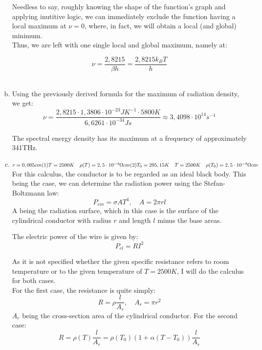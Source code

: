 \documentclass[a4paper,german,12pt]{scrartcl}
\begin{document}
\begin{enumerate}[(a)]
Needless to say, roughly knowing the shape of the function's graph and applying inutitive logic, we can immediately exclude the function having a local maximum at $\nu=0$, where, in fact, we will obtain a local (and global) minimum.\\
 Thus, we are left with one single local and global maximum, namely at:

\begin{equation*}
\nu=\frac{2,8215}{\beta h}=\frac{2,8215k_BT}{h}
\end{equation*}\\

\item Using the previously derived formula for the maximum of radiation density, we get:
\begin{equation*}
\nu=\frac{2,8215\cdot 1,3806 \cdot 10^{-23}JK^{-1}\cdot 5800K}{6,6261\cdot 10^{-34}Js}\approx 3,4098\cdot 10^{14}s^{-1}
\end{equation*}

The spectral energy density has its maximum at a frequency of approximately 341THz.

\item $r=0,005cm\\
 (1)T=2500K \quad \rho(T)=2,5\cdot 10^{-4}\Omega cm\\ (2)T_0=295,15K \quad T=2500K \quad \rho(T_0)=2,5\cdot 10^{-4}\Omega cm$\\

For this calculus, the conductor is to be regarded as an ideal black body. This being the case, we can determine the radiation power using the Stefan-Boltzmann law:
\begin{equation*}
P_{em}=\sigma A T^4, \quad A=2\pi r l
\end{equation*}
A being the radiation surface, which in this case is the surface of the cylindrical conductor with radius $r$ and length $l$ minus the base areas.

The electric power of the wire is given by:
\begin{equation*}
P_{el}=RI^2
\end{equation*}

As it is not specified whether the given specific resistance refers to room temperature or to the given temperature of $T=2500K$, I will do the calculus for both cases.\\

For the first case, the resistance is quite simply:
\begin{equation*}
R=\rho\frac{l}{A_r}, \quad A_r=\pi r^2
\end{equation*}
$A_{r}$ being the cross-section area of the cylindrical conductor.
For the second case:
\begin{equation*}
R=\rho(T)\frac{l}{A_{r}}=\rho(T_0)(1+\alpha(T-T_0))\frac{l}{A_{r}}
\end{equation*}


\end{enumerate}
\end{document}
